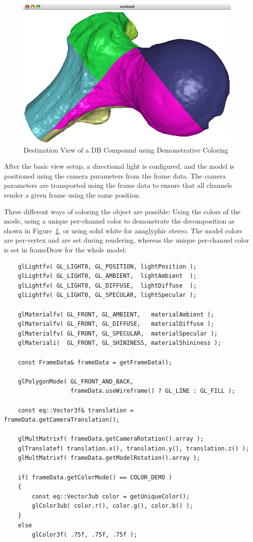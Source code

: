 \documentclass[10pt,a4]{scrartcl}
\newcommand{\fig}[1]{Figure~\ref{#1}}
\begin{document}
\begin{figure}
  \includegraphics[width=.382\textwidth]{images/DB.png}
  {\caption{\label{fDBDest}Destination View of a DB Compound using
      Demonstrative Coloring}}
\end{figure}
After the basic view setup, a directional light is configured, and the
model is positioned using the camera parameters from the frame data. The
camera parameters are transported using the frame data to ensure
that all channels render a given frame using the same position.

Three different ways of coloring the object are possible: Using the
colors of the mode, using a unique per-channel color to demonstrate the
decomposition as shown in \fig{fDBDest}, or using solid white for
anaglyphic stereo. The model colors are per-vertex and are set during
rendering, whereas the unique per-channel color is set in
\textsf{frameDraw} for the whole model:

{\footnotesize\begin{lstlisting}
    glLightfv( GL_LIGHT0, GL_POSITION, lightPosition );
    glLightfv( GL_LIGHT0, GL_AMBIENT,  lightAmbient  );
    glLightfv( GL_LIGHT0, GL_DIFFUSE,  lightDiffuse  );
    glLightfv( GL_LIGHT0, GL_SPECULAR, lightSpecular );

    glMaterialfv( GL_FRONT, GL_AMBIENT,   materialAmbient );
    glMaterialfv( GL_FRONT, GL_DIFFUSE,   materialDiffuse );
    glMaterialfv( GL_FRONT, GL_SPECULAR,  materialSpecular );
    glMateriali(  GL_FRONT, GL_SHININESS, materialShininess );

    const FrameData& frameData = getFrameData();

    glPolygonMode( GL_FRONT_AND_BACK, 
                   frameData.useWireframe() ? GL_LINE : GL_FILL );

    const eq::Vector3f& translation = frameData.getCameraTranslation();

    glMultMatrixf( frameData.getCameraRotation().array );
    glTranslatef( translation.x(), translation.y(), translation.z() );
    glMultMatrixf( frameData.getModelRotation().array );

    if( frameData.getColorMode() == COLOR_DEMO )
    {
        const eq::Vector3ub color = getUniqueColor();
        glColor3ub( color.r(), color.g(), color.b() );
    }
    else
        glColor3f( .75f, .75f, .75f );
\end{lstlisting}}
\end{document}
